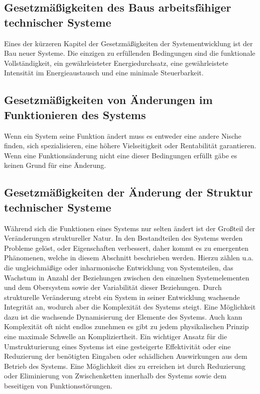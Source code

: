 \documentclass[a4paper,12pt]{article}
\begin{document}
\subsection{Gesetzmäßigkeiten des Baus arbeitsfähiger technischer Systeme}

Eines der kürzeren Kapitel der Gesetzmäßigkeiten der Systementwicklung ist der Bau neuer Systeme. Die einzigen zu erfüllenden Bedingungen sind die funktionale Vollständigkeit, ein gewährleisteter Energiedurchsatz, eine gewährleistete Intensität im Energieaustausch und eine minimale Steuerbarkeit. 

\subsection{Gesetzmäßigkeiten von Änderungen im Funktionieren des Systems}

Wenn ein System seine Funktion ändert muss es entweder eine andere Nische finden, sich spezialisieren, eine höhere Vielseitigkeit oder Rentabilität garantieren. Wenn eine Funktionsänderung nicht eine dieser Bedingungen erfüllt gäbe es keinen Grund für eine Änderung.

\subsection{Gesetzmäßigkeiten der Änderung der Struktur technischer Systeme}

Während sich die Funktionen eines Systems nur selten ändert ist der Großteil der Veränderungen struktureller Natur. In den Bestandteilen des Systems werden Probleme gelöst, oder Eigenschaften verbessert, daher kommt es zu emergenten Phänomenen, welche in diesem Abschnitt beschrieben werden. Hierzu zählen u.a. die ungleichmäßige oder inharmonische Entwicklung von Systemteilen, das Wachstum in Anzahl der Beziehungen zwischen den einzelnen Systemelementen und dem Obersystem sowie der Variabilität dieser Beziehungen. Durch strukturelle Veränderung strebt ein System in seiner Entwicklung wachsende Integrität an, wodurch aber die Komplexität des Systems steigt. Eine Möglichkeit dazu ist die wachsende Dynamisierung der Elemente des Systems. Auch kann Komplexität oft nicht endlos zunehmen es gibt zu jedem physikalischen Prinzip eine maximale Schwelle an Kompliziertheit. Ein wichtiger Ansatz für die Umstrukturierung eines Systems ist eine gesteigerte Effektivität oder eine Reduzierung der benötigten Eingaben oder schädlichen Auswirkungen aus dem Betrieb des Systems. Eine Möglichkeit dies zu erreichen ist durch Reduzierung oder Eliminierung von Zwischenketten innerhalb des Systems sowie dem beseitigen von Funktionsstörungen.
\end{document}
